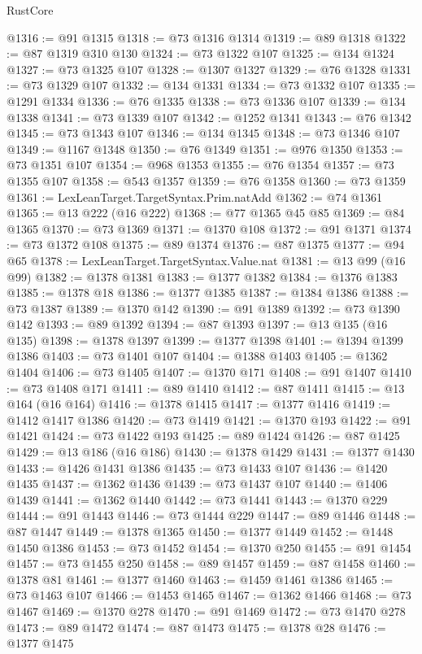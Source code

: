 \begin{lexlean}{RustCore}
\begin{coremodule}
@1316 := @91 @1315
@1318 := @73 @1316 @1314
@1319 := @89 @1318
@1322 := @87 @1319 @310 @130
@1324 := @73 @1322 @107
@1325 := @134 @1324
@1327 := @73 @1325 @107
@1328 := @1307 @1327
@1329 := @76 @1328
@1331 := @73 @1329 @107
@1332 := @134 @1331
@1334 := @73 @1332 @107
@1335 := @1291 @1334
@1336 := @76 @1335
@1338 := @73 @1336 @107
@1339 := @134 @1338
@1341 := @73 @1339 @107
@1342 := @1252 @1341
@1343 := @76 @1342
@1345 := @73 @1343 @107
@1346 := @134 @1345
@1348 := @73 @1346 @107
@1349 := @1167 @1348
@1350 := @76 @1349
@1351 := @976 @1350
@1353 := @73 @1351 @107
@1354 := @968 @1353
@1355 := @76 @1354
@1357 := @73 @1355 @107
@1358 := @543 @1357
@1359 := @76 @1358
@1360 := @73 @1359
@1361 := LexLeanTarget.TargetSyntax.Prim.natAdd
@1362 := @74 @1361
@1365 := @13 @222 (@16 @222)
@1368 := @77 @1365 @45 @85
@1369 := @84 @1365
@1370 := @73 @1369
@1371 := @1370 @108
@1372 := @91 @1371
@1374 := @73 @1372 @108
@1375 := @89 @1374
@1376 := @87 @1375
@1377 := @94 @65
@1378 := LexLeanTarget.TargetSyntax.Value.nat
@1381 := @13 @99 (@16 @99)
@1382 := @1378 @1381
@1383 := @1377 @1382
@1384 := @1376 @1383
@1385 := @1378 @18
@1386 := @1377 @1385
@1387 := @1384 @1386
@1388 := @73 @1387
@1389 := @1370 @142
@1390 := @91 @1389
@1392 := @73 @1390 @142
@1393 := @89 @1392
@1394 := @87 @1393
@1397 := @13 @135 (@16 @135)
@1398 := @1378 @1397
@1399 := @1377 @1398
@1401 := @1394 @1399 @1386
@1403 := @73 @1401 @107
@1404 := @1388 @1403
@1405 := @1362 @1404
@1406 := @73 @1405
@1407 := @1370 @171
@1408 := @91 @1407
@1410 := @73 @1408 @171
@1411 := @89 @1410
@1412 := @87 @1411
@1415 := @13 @164 (@16 @164)
@1416 := @1378 @1415
@1417 := @1377 @1416
@1419 := @1412 @1417 @1386
@1420 := @73 @1419
@1421 := @1370 @193
@1422 := @91 @1421
@1424 := @73 @1422 @193
@1425 := @89 @1424
@1426 := @87 @1425
@1429 := @13 @186 (@16 @186)
@1430 := @1378 @1429
@1431 := @1377 @1430
@1433 := @1426 @1431 @1386
@1435 := @73 @1433 @107
@1436 := @1420 @1435
@1437 := @1362 @1436
@1439 := @73 @1437 @107
@1440 := @1406 @1439
@1441 := @1362 @1440
@1442 := @73 @1441
@1443 := @1370 @229
@1444 := @91 @1443
@1446 := @73 @1444 @229
@1447 := @89 @1446
@1448 := @87 @1447
@1449 := @1378 @1365
@1450 := @1377 @1449
@1452 := @1448 @1450 @1386
@1453 := @73 @1452
@1454 := @1370 @250
@1455 := @91 @1454
@1457 := @73 @1455 @250
@1458 := @89 @1457
@1459 := @87 @1458
@1460 := @1378 @81
@1461 := @1377 @1460
@1463 := @1459 @1461 @1386
@1465 := @73 @1463 @107
@1466 := @1453 @1465
@1467 := @1362 @1466
@1468 := @73 @1467
@1469 := @1370 @278
@1470 := @91 @1469
@1472 := @73 @1470 @278
@1473 := @89 @1472
@1474 := @87 @1473
@1475 := @1378 @28
@1476 := @1377 @1475

\end{coremodule}
\end{lexlean}
